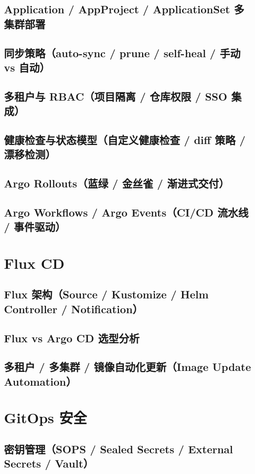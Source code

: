 \documentclass[12pt,UTF8]{ctexbook}
\begin{document}
    \subsection{Application / AppProject / ApplicationSet 多集群部署}
    \subsection{同步策略（auto-sync / prune / self-heal / 手动 vs 自动）}
    \subsection{多租户与 RBAC（项目隔离 / 仓库权限 / SSO 集成）}
    \subsection{健康检查与状态模型（自定义健康检查 / diff 策略 / 漂移检测）}
    \subsection{Argo Rollouts（蓝绿 / 金丝雀 / 渐进式交付）}
    \subsection{Argo Workflows / Argo Events（CI/CD 流水线 / 事件驱动）}

  \section{Flux CD}
    \subsection{Flux 架构（Source / Kustomize / Helm Controller / Notification）}
    \subsection{Flux vs Argo CD 选型分析}
    \subsection{多租户 / 多集群 / 镜像自动化更新（Image Update Automation）}

  \section{GitOps 安全}
    \subsection{密钥管理（SOPS / Sealed Secrets / External Secrets / Vault）}
\end{document}

